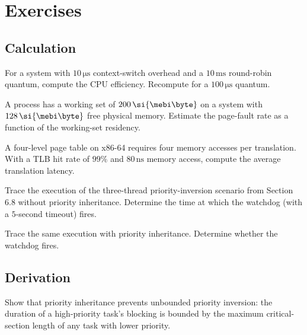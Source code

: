 \section{Exercises}

\subsection*{Calculation}

\begin{exercise}
For a system with $10\,\si{\micro\second}$ context-switch overhead and a $10\,\si{\milli\second}$ round-robin quantum, compute the CPU efficiency. Recompute for a $100\,\si{\micro\second}$ quantum.
\end{exercise}

\begin{exercise}
A process has a working set of $200\,\si{\mebi\byte}$ on a system with $128\,\si{\mebi\byte}$ free physical memory. Estimate the page-fault rate as a function of the working-set residency.
\end{exercise}

\begin{exercise}
A four-level page table on x86-64 requires four memory accesses per translation. With a TLB hit rate of $99\%$ and $80\,\si{\nano\second}$ memory access, compute the average translation latency.
\end{exercise}

\begin{exercise}
Trace the execution of the three-thread priority-inversion scenario from Section 6.8 without priority inheritance. Determine the time at which the watchdog (with a $5$-second timeout) fires.
\end{exercise}

\begin{exercise}
Trace the same execution with priority inheritance. Determine whether the watchdog fires.
\end{exercise}

\subsection*{Derivation}

\begin{exercise}
Show that priority inheritance prevents unbounded priority inversion: the duration of a high-priority task's blocking is bounded by the maximum critical-section length of any task with lower priority.
\end{exercise}

